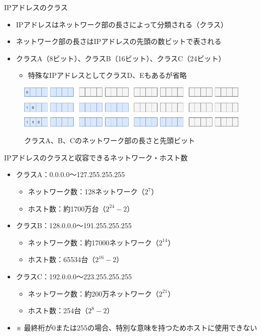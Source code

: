\documentclass[12pt,aspectratio=169]{beamer}
\begin{document}
\begin{frame}{IPアドレスのクラス}

    \begin{itemize}
      \item IPアドレスはネットワーク部の長さによって分類される（クラス）
      \item ネットワーク部の長さはIPアドレスの先頭の数ビットで表される
      \item クラスA（8ビット）、クラスB（16ビット）、クラスC（24ビット）
      \begin{itemize}
        \item 特殊なIPアドレスとしてクラスD、Eもあるが省略
      \end{itemize}
    \end{itemize}

    \begin{figure}
      \centering
      \includegraphics[width=12cm,bb=0 0 741 134]{./figures/ipblock_abc.png}
      \label{fig:ipblock_abc}
      \caption{クラスA、B、Cのネットワーク部の長さと先頭ビット}
    \end{figure}

\end{frame}


\begin{frame}{IPアドレスのクラスと収容できるネットワーク・ホスト数}

  \begin{itemize}
    \item クラスA：0.0.0.0〜127.255.255.255
      \begin{itemize}
        \item ネットワーク数：128ネットワーク（\( 2^{7} \)）
        \item ホスト数：約1700万台（\( 2^{24} - 2 \)）
      \end{itemize}
    \item クラスB：128.0.0.0〜191.255.255.255
      \begin{itemize}
        \item ネットワーク数：約17000ネットワーク（\( 2^{14} \)）
        \item ホスト数：65534台（\( 2^{16} - 2 \)）
      \end{itemize}
    \item クラスC：192.0.0.0〜223.255.255.255
      \begin{itemize}
        \item ネットワーク数：約200万ネットワーク（\( 2^{21} \)）
        \item ホスト数：254台（\( 2^{8} - 2 \)）
      \end{itemize}
    \item { \small ※ 最終桁が0または255の場合、特別な意味を持つためホストに使用できない }
  \end{itemize}

\end{frame}
\end{document}
